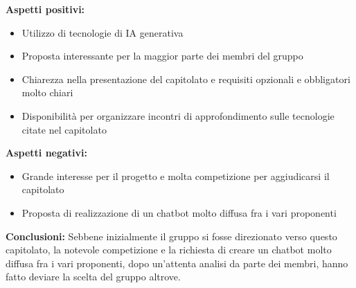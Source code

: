 \documentclass[10pt]{article}
\begin{document}
\textbf{Aspetti positivi:}
\begin{itemize}
    \item Utilizzo di  tecnologie di IA generativa
    \item Proposta interessante per la maggior parte dei membri del gruppo
    \item Chiarezza nella presentazione del capitolato e requisiti opzionali e obbligatori molto chiari
    \item Disponibilità per organizzare incontri di approfondimento sulle tecnologie citate nel capitolato
\end{itemize}
\textbf{Aspetti negativi:}
\begin{itemize}
    \item Grande interesse per il progetto e molta competizione per aggiudicarsi il capitolato
    \item Proposta di realizzazione di un chatbot molto diffusa fra i vari proponenti
\end{itemize}
\textbf{Conclusioni:}
Sebbene inizialmente il gruppo si fosse direzionato verso questo capitolato, la notevole competizione e la richiesta di creare un chatbot molto diffusa fra i vari proponenti, dopo un'attenta analisi da parte dei membri, hanno fatto deviare la scelta del gruppo altrove.
\end{document}
